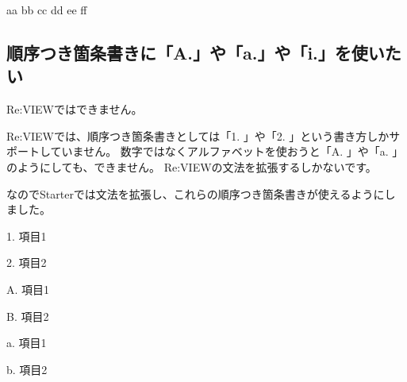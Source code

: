 \begin{starterprogram}\end{starterprogram}
\noindent
{}

\starterresult

\begin{starteritemize}
\item aa bb
   cc dd
   ee ff
\end{starteritemize}

\endstarterresult

\subsection{順序つき箇条書きに「A.」や「a.」や「i.」を使いたい}
\label{sec:2-2-2}

Re:VIEWではできません。

Re:VIEWでは、順序つき箇条書きとしては「1. 」や「2. 」という書き方しかサポートしていません。
数字ではなくアルファベットを使おうと「A. 」や「a. 」のようにしても、できません。
Re:VIEWの文法を拡張するしかないです。

なのでStarterでは文法を拡張し、これらの順序つき箇条書きが使えるようにしました。

\begin{starterprogram}\end{starterprogram}
\noindent
{}

\starterresult

\begin{starterenumerate}
\item[1.] 項目1
\item[2.] 項目2
\end{starterenumerate}

\begin{starterenumerate}
\item[A.] 項目1
\item[B.] 項目2
\end{starterenumerate}

\begin{starterenumerate}
\item[a.] 項目1
\item[b.] 項目2
\end{starterenumerate}

